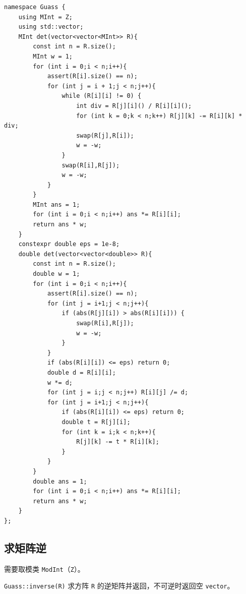 \begin{lstlisting}
namespace Guass {
    using MInt = Z;
    using std::vector;
    MInt det(vector<vector<MInt>> R){
        const int n = R.size();
        MInt w = 1;
        for (int i = 0;i < n;i++){
            assert(R[i].size() == n);
            for (int j = i + 1;j < n;j++){
                while (R[i][i] != 0) {
                    int div = R[j][i]() / R[i][i]();
                    for (int k = 0;k < n;k++) R[j][k] -= R[i][k] * div;
                    swap(R[j],R[i]);
                    w = -w;
                }
                swap(R[i],R[j]);
                w = -w;
            }
        }
        MInt ans = 1;
        for (int i = 0;i < n;i++) ans *= R[i][i];
        return ans * w;
    }
    constexpr double eps = 1e-8;
    double det(vector<vector<double>> R){
        const int n = R.size();
        double w = 1;
        for (int i = 0;i < n;i++){
            assert(R[i].size() == n);
            for (int j = i+1;j < n;j++){
                if (abs(R[j][i]) > abs(R[i][i])) {
                    swap(R[i],R[j]);
                    w = -w;
                }
            }
            if (abs(R[i][i]) <= eps) return 0;
            double d = R[i][i];
            w *= d;
            for (int j = i;j < n;j++) R[i][j] /= d;
            for (int j = i+1;j < n;j++){
                if (abs(R[i][i]) <= eps) return 0;
                double t = R[j][i];
                for (int k = i;k < n;k++){
                    R[j][k] -= t * R[i][k];
                }
            }
        }
        double ans = 1;
        for (int i = 0;i < n;i++) ans *= R[i][i];
        return ans * w;
    }
};
\end{lstlisting}

\subsection{求矩阵逆}

需要取模类 \texttt{ModInt}（\texttt{Z}）。

\texttt{Guass::inverse(R)} 求方阵 \texttt{R} 的逆矩阵并返回，不可逆时返回空 \texttt{vector}。

